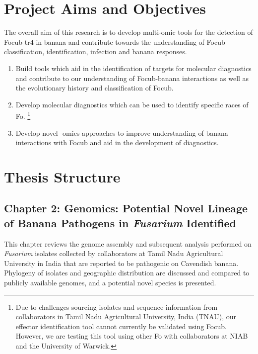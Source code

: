 \newpage
\section{Project Aims and Objectives}

The overall aim of this research is to develop multi-omic tools for the detection of \acl{Focub} \ac{tr4} in banana and contribute towards the understanding of \acl{Focub} classification, identification, infection and banana responses. 

\begin{enumerate}
    \item Build tools which aid in the identification of targets for molecular diagnostics and contribute to our understanding of \ac{Focub}-banana interactions as well as the evolutionary history and classification of \ac{Focub}. 
    \item Develop molecular diagnostics which can be used to identify specific races of \acl{Fo}. \footnote{Due to challenges sourcing isolates and sequence information from collaborators in Tamil Nadu Agricultural University, India (TNAU), our effector identification tool cannot currently be validated using \ac{Focub}. However, we are testing this tool using other \acl{Fo}  with collaborators at NIAB and the University of Warwick.} 
    \item Develop novel -omics approaches to improve understanding of banana interactions with \ac{Focub} and aid in the development of diagnostics.
\end{enumerate}

\newpage
\section{Thesis Structure}

\subsection{Chapter 2: Genomics: Potential Novel Lineage of Banana Pathogens in \textit{Fusarium}  Identified} 

This chapter reviews the  genome assembly and subsequent analysis performed on \textit{Fusarium} isolates collected by collaborators at Tamil Nadu Agricultural University in India that are reported to be pathogenic on Cavendish banana. Phylogeny of isolates and geographic distribution are discussed and compared to publicly available genomes, and a potential novel species is presented. 

